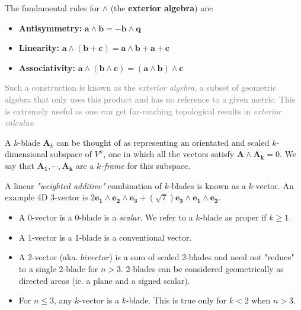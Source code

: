 \documentclass[a4paper]{book}
\numberwithin{equation}{chapter}
\begin{document}
The fundamental rules for $\wedge$ (the \textbf{exterior algebra}) 
are:

\begin{tcolorbox}[colback=white, colframe = purple!60!black, title=\textbf{Exterior Product Rules} ]

\begin{itemize}
    \item \textbf{Antisymmetry:} $\mathbf{a}\wedge \mathbf{b} = -\mathbf{b}\wedge \mathbf{q}$
    
    \item \textbf{Linearity:} $\mathbf{a}\wedge(\textbf{b}+\mathbf{c}) = \mathbf{a}\wedge\mathbf{b}+\mathbf{a}+\mathbf{c}$
    
    \item \textbf{Associativity:} $\mathbf{a}\wedge(\mathbf{b}\wedge \mathbf{c})=(\mathbf{a}\wedge\mathbf{b})\wedge\mathbf{c}$
\end{itemize}

\end{tcolorbox} 

\textcolor{gray}{Such a construction is known as the \emph{exterior algebra}, a subset
of geometric algebra that only uses this product and has no reference to a given metric.
This is extremely useful as one can get far-reaching topological results in \emph{exterior
calculus.}}

A $k$-blade $\mathbf{A}_k$ can be thought of as representing an orientated and scaled 
$k$-dimensional subspace of $V^n$, one in which all the vectors satisfy 
$\mathbf{A\wedge A_k} = 0$. 
We say that $\mathbf{A_1, \cdots, A_k}$ are a \emph{$k$-frame} for this subspace. 

\vspace{\baselineskip}

A linear \emph{"weighted additive"} combination of $k$-blades is known as a $k$-vector. 
An example 4D 3-vector is 
$ 2\mathbf{e_1\wedge e_2\wedge e_3} + (\sqrt{7})\mathbf{e_3 \wedge e_1 \wedge e_2}$.

\begin{itemize}
    \item A 0-vector is a 0-blade is a \emph{scalar}. We refer to a $k$-blade as proper if $k\ge1$.
    \item A 1-vector is a 1-blade is a conventional vector.
    \item A 2-vector (aka. $bivector$) is a sum of scaled 2-blades and need not "reduce" to a single 2-blade for $n>3$. 2-blades can be considered geometrically as directed areas (ie. a plane and a signed scalar).
    \item For $n\le3$, any $k$-vector is a $k$-blade. This is true only for $k<2$ when $n > 3$.
\end{itemize}
\end{document}
